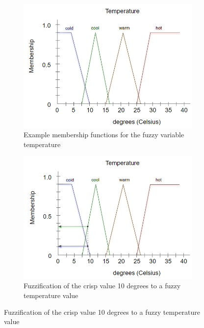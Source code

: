 \documentclass[12pt]{report}
\begin{document}
\begin{figure}
    \centering
    \begin{subfigure}{.5\linewidth}
        \includegraphics[width=\linewidth]{figure/mem_func.png}
        \caption{Example membership functions for the fuzzy variable temperature}
        \label{fig:mem_func}
    \end{subfigure}
    \newline
    \begin{subfigure}{.5\linewidth}
        \includegraphics[width=\linewidth]{figure/fuzzification.png}
        \caption{Fuzzification of the crisp value 10 degrees to a fuzzy temperature value}
        \label{fig:fuzzification}
    \end{subfigure}
    \newline

\end{figure}
\end{document}
